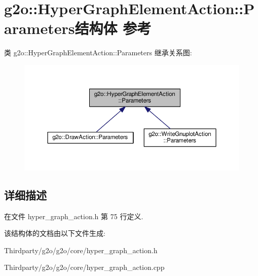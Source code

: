 \hypertarget{structg2o_1_1HyperGraphElementAction_1_1Parameters}{\section{g2o\-:\-:Hyper\-Graph\-Element\-Action\-:\-:Parameters结构体 参考}
\label{structg2o_1_1HyperGraphElementAction_1_1Parameters}
}


类 g2o\-:\-:Hyper\-Graph\-Element\-Action\-:\-:Parameters 继承关系图\-:
\nopagebreak
\begin{figure}[H]
\begin{center}
\leavevmode
\includegraphics[width=350pt]{structg2o_1_1HyperGraphElementAction_1_1Parameters__inherit__graph}
\end{center}
\end{figure}


\subsection{详细描述}


在文件 hyper\-\_\-graph\-\_\-action.\-h 第 75 行定义.



该结构体的文档由以下文件生成\-:\begin{DoxyCompactItemize}
\item 
Thirdparty/g2o/g2o/core/hyper\-\_\-graph\-\_\-action.\-h\item 
Thirdparty/g2o/g2o/core/hyper\-\_\-graph\-\_\-action.\-cpp\end{DoxyCompactItemize}
